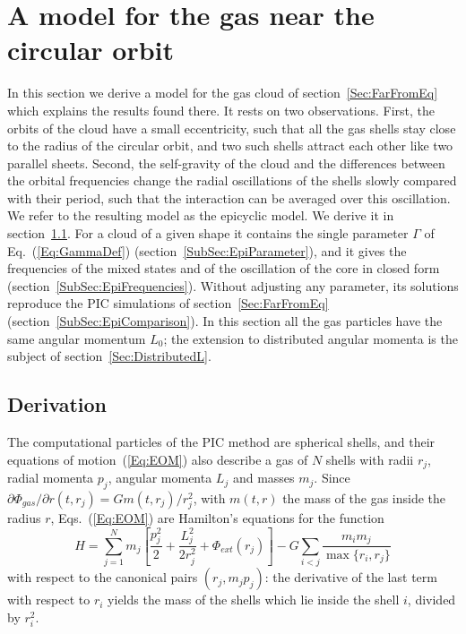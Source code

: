 \section{A model for the gas near the circular orbit}
\label{Sec:Epicyclic}

In this section we derive a model for the gas cloud of section~\ref{Sec:FarFromEq} which explains the results found there. It rests on two observations. First, the orbits of the cloud have a small eccentricity, such that all the gas shells stay close to the radius of the circular orbit, and two such shells attract each other like two parallel sheets. Second, the self-gravity of the cloud and the differences between the orbital frequencies change the radial oscillations of the shells slowly compared with their period, such that the interaction can be averaged over this oscillation. We refer to the resulting model as the epicyclic model. We derive it in section~\ref{SubSec:EpiDerivation}. For a cloud of a given shape it contains the single parameter $\Gamma$ of Eq.~(\ref{Eq:GammaDef}) (section~\ref{SubSec:EpiParameter}), and it gives the frequencies of the mixed states and of the oscillation of the core in closed form (section~\ref{SubSec:EpiFrequencies}). Without adjusting any parameter, its solutions reproduce the PIC simulations of section~\ref{Sec:FarFromEq} (section~\ref{SubSec:EpiComparison}). In this section all the gas particles have the same angular momentum $L_0$; the extension to distributed angular momenta is the subject of section~\ref{Sec:DistributedL}.


\subsection{Derivation}
\label{SubSec:EpiDerivation}

The computational particles of the PIC method are spherical shells, and their equations of motion~(\ref{Eq:EOM}) also describe a gas of $N$ shells with radii $r_j$, radial momenta $p_j$, angular momenta $L_j$ and masses $m_j$. Since $\partial\Phi_{gas}/\partial r(t,r_j) = G m(t,r_j)/r_j^2$, with $m(t,r)$ the mass of the gas inside the radius $r$, Eqs.~(\ref{Eq:EOM}) are Hamilton's equations for the function
\begin{equation}
H = \sum\limits_{j=1}^N m_j\left[ \frac{p_j^2}{2} + \frac{L_j^2}{2r_j^2} + \Phi_{ext}(r_j) \right]
 - G\sum\limits_{i<j} \frac{m_i m_j}{\max\{ r_i,r_j \}}
\label{Eq:ShellH}
\end{equation}
with respect to the canonical pairs $(r_j,m_j p_j)$: the derivative of the last term with respect to $r_i$ yields the mass of the shells which lie inside the shell $i$, divided by $r_i^2$.

